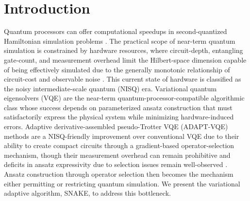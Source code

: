 \documentclass[
  reprint,
  amsmath,
  amssymb,
  aps,
  pra,
  nofootinbib,
  superscriptaddress,
  floatfix
]{revtex4-2}
\begin{document}
\maketitle







\section{Introduction}

Quantum processors can offer computational speedups in second-quantized Hamiltonian simulation problems \cite{Lloyd1996,AspuruGuzik2005}. The practical scope of near-term quantum simulation is constrained by hardware resources, where circuit-depth, entangling gate-count, and measurement overhead limit the Hilbert-space dimension capable of being effectively simulated due to the generally monotonic relationship of circuit-cost and observable noise \cite{Preskill2018NISQ,Cerezo2021VQA,Huggins2021Measurements}. This current state of hardware is classified as the noisy intermediate-scale quantum (NISQ) era. Variational quantum eigensolvers (VQE) are the near-term quantum-processor-compatible algorithmic class whose success depends on parameterized ansatz construction that must satisfactorily express the physical system while minimizing hardware-induced errors. Adaptive derivative-assembled pseudo-Trotter VQE (ADAPT-VQE) methods are a NISQ-friendly improvement over conventional VQE due to their ability to create compact circuits through a gradient-based operator-selection mechanism, though their measurement overhead can remain prohibitive and deficits in ansatz expressivity due to selection issues remain well-observed \cite{Grimsley2019,Tang2021,Yordanov2021,Feniou2023,Ramoa2025HessianRecycling,Ikhtiarudin2025ShotEfficient}. Ansatz construction through operator selection then becomes the mechanism either permitting or restricting quantum simulation. We present the variational adaptive algorithm, SNAKE, to address this bottleneck.
\end{document}
